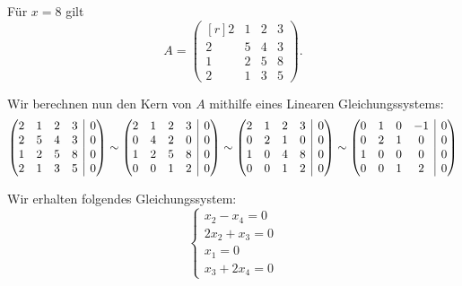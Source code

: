 \documentclass[answers]{exam}
\makeatletter
\newenvironment{sysmatrix}[1]
  {\left(\begin{array}{@{}#1@{}}}
  {\end{array}\right)}
\newcommand{\vektor}[1]{\begin{pmatrix*}[r] #1 \end{pmatrix*}}
\makeatother
\begin{document}
\begin{questions}
\begin{parts}
\begin{solution}
            Für $x=8$ gilt
            $$
                A = \vektor{2 & 1 & 2 & 3 \\ 2 & 5 & 4 & 3 \\ 1 & 2 & 5 & 8 \\ 2 & 1 & 3 & 5}.
            $$

            Wir berechnen nun den Kern von $A$ mithilfe eines Linearen Gleichungssystems:
            $$
                \begin{sysmatrix}{cccc|c}
                    2 & 1 & 2 & 3 & 0 \\
                    2 & 5 & 4 & 3 & 0 \\
                    1 & 2 & 5 & 8 & 0 \\
                    2 & 1 & 3 & 5 & 0
                \end{sysmatrix}
                \sim
                \begin{sysmatrix}{cccc|c}
                    2 & 1 & 2 & 3 & 0 \\
                    0 & 4 & 2 & 0 & 0 \\
                    1 & 2 & 5 & 8 & 0 \\
                    0 & 0 & 1 & 2 & 0
                \end{sysmatrix}
                \sim
                \begin{sysmatrix}{cccc|c}
                    2 & 1 & 2 & 3 & 0 \\
                    0 & 2 & 1 & 0 & 0 \\
                    1 & 0 & 4 & 8 & 0 \\
                    0 & 0 & 1 & 2 & 0
                \end{sysmatrix}
                \sim
                \begin{sysmatrix}{cccc|c}
                    0 & 1 & 0 & -1 & 0 \\
                    0 & 2 & 1 & 0 & 0 \\
                    1 & 0 & 0 & 0 & 0 \\
                    0 & 0 & 1 & 2 & 0
                \end{sysmatrix}
            $$

            Wir erhalten folgendes Gleichungssystem:
            $$
                \begin{cases}
                    x_2 - x_4 = 0  \\
                    2x_2 + x_3 = 0 \\
                    x_1 = 0        \\
                    x_3 + 2x_4 = 0
                \end{cases}
            $$


\end{solution}
\end{parts}
\end{questions}
\end{document}
